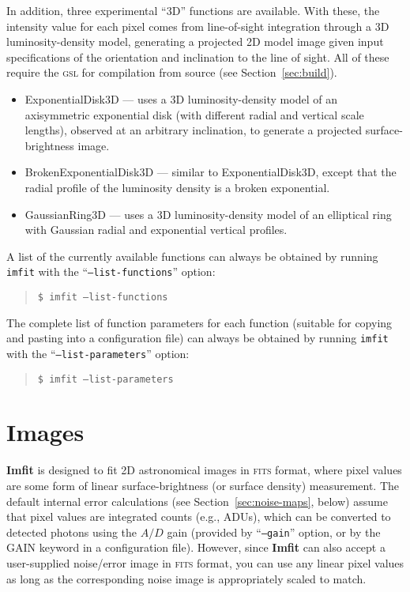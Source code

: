 \documentclass[10pt,a4paper,article]{memoir}
\newcommand{\imfit}{\textbf{Imfit}}
\newcommand{\Imfit}{\textbf{Imfit}}
\newcommand{\imfitprog}{\texttt{imfit}}
\begin{document}
In addition, three experimental ``3D'' functions are available. With these, the
intensity value for each pixel comes from line-of-sight
integration through a 3D luminosity-density model, generating a projected 2D
model image given input specifications of the orientation and inclination
to the line of sight. All of these require the \textsc{gsl} for compilation from source (see Section~\ref{sec:build}).
\begin{itemize}
\item ExponentialDisk3D --- uses a 3D luminosity-density model of an axisymmetric 
exponential disk (with different radial and vertical scale lengths), observed
at an arbitrary inclination, to generate a projected surface-brightness image.
\item BrokenExponentialDisk3D --- similar to ExponentialDisk3D, except that the
radial profile of the luminosity density is a broken exponential.
\item GaussianRing3D --- uses a 3D 
luminosity-density model of an elliptical ring with Gaussian radial and exponential 
vertical profiles.

\end{itemize}

A list of the currently available functions can always be obtained
by running \imfitprog{} with the ``\texttt{--list-functions}'' option:
\begin{quote}
  \texttt{\$ \imfitprog{} --list-functions}
\end{quote}
The complete list of function parameters for each function (suitable for copying
and pasting into a configuration file) can always be
obtained by running \imfitprog{} with the ``\texttt{--list-parameters}'' option:
\begin{quote}
  \texttt{\$ \imfitprog{} --list-parameters}
\end{quote}




\chapter{Images}

\Imfit{} is designed to fit 2D astronomical images in \textsc{fits} format, where
pixel values are some form of linear surface-brightness (or surface
density) measurement. The default internal error calculations (see
Section~\ref{sec:noise-maps}, below) assume that pixel values are
integrated counts (e.g., ADUs), which can be converted to detected
photons using the $A/D$ gain (provided by ``\texttt{--gain}'' option, or
by the GAIN keyword in a configuration file). However, since \imfit{} can
also accept a user-supplied noise/error image in \textsc{fits} format, you can
use any linear pixel values as long as the corresponding noise image is
appropriately scaled to match.
\end{document}
